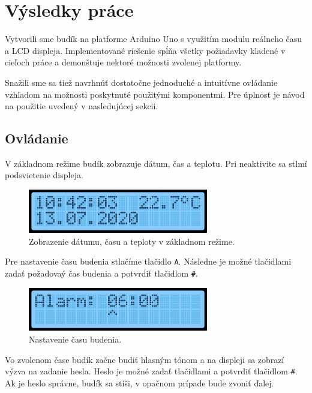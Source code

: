 \chapter{Výsledky práce}
Vytvorili sme budík na platforme Arduino Uno s využitím modulu reálneho času a LCD displeja. Implementované riešenie spĺňa všetky požiadavky kladené v cieľoch práce a demonštuje nektoré možnosti zvolenej platformy.

Snažili sme sa tiež navrhnúť dostatočne jednoduché a intuitívne ovládanie vzhľadom na možnosti poskytnuté použitými komponentmi. Pre úplnosť je návod na použitie uvedený v nasledujúcej sekcii.

\section{Ovládanie}
V základnom režime budík zobrazuje dátum, čas a teplotu. Pri neaktivite sa stlmí podsvietenie displeja.

\vspace{5mm}
\begin{figure}[h]
    \centering
    \includegraphics[width=0.7\textwidth]{img/display_time.png}
    \caption{Zobrazenie dátumu, času a teploty v základnom režime.}
\end{figure}

Pre nastavenie času budenia stlačíme tlačidlo \texttt{A}. Následne je možné tlačidlami zadať požadovaý čas budenia a potvrdiť tlačidlom \texttt{\#}.

\vspace{5mm}
\begin{figure}[h]
    \centering
    \includegraphics[width=0.7\textwidth]{img/display_set_alarm.png}
    \caption{Nastavenie času budenia.}
\end{figure}

\clearpage

Vo zvolenom čase budík začne budiť hlasným tónom a na displeji sa zobrazí výzva na zadanie hesla. Heslo je možné zadať tlačidlami a potvrdiť tlačidlom \texttt{\#}. Ak je heslo správne, budík sa stíši, v opačnom prípade bude zvoniť ďalej.


